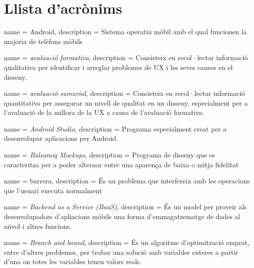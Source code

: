 \chapter*{Llista d'acrònims}
\label{sec:glossary}


\begin{acronym}
\end{acronym}

{
name = Android, description = {Sistema operatiu mòbil amb el qual funcionen la majoria de telèfons mòbils \cite{Android_OS}}
}

{
name = \textit{avaluació formativa}, description = {Consisteix en recol·lectar informació qualitativa
per identificar i arreglar problemes de \ac{UX} i les seves causes en el disseny.}
}

{
name = \textit{avaluació sumarial}, description = {Consisteix en recol·lectar informació quantitativa per assegurar un nivell de qualitat en un disseny, especialment per a l'avaluació de la millora de la \ac{UX} a causa de l'avaluació formativa.}
}

{
name = \textit{Android Studio}, description = {Programa especialment creat per a desenvolupar aplicacions per Android.}
}

{
name = \textit{Balsamiq Mockups}, description = {Programa de disseny que es caracteritza per a poder alternar entre una aparença de baixa o mitja fidelitat}
}

{
name = barrera, description = {És un problema que interfereix amb les operacions que l'usuari executa normalment}
}

{
name = \textit{Backend as a Service (BaaS)}, description = {És un model per proveir als desenvolupadors d'apliacions mòbils una forma d'emmagatzematge de dades al núvol i altres funcions.}
}

{
name = \textit{Branch and bound}, description = {És un algoritme d'optimització emprat, entre d'altres problemes, per trobar una solució amb variables enteres a partir d'una on totes les variables tenen valors reals.}
}

